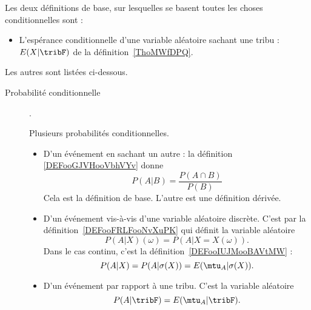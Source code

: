 

Les deux définitions de base, sur lesquelles se basent toutes les choses conditionnelles sont :
\begin{itemize}
	\item L'espérance conditionnelle d'une variable aléatoire sachant une tribu : \( E(X|\tribF)\) de la définition~\ref{ThoMWfDPQ}.
\end{itemize}

Les autres sont listées ci-dessous.
\begin{description}

	\item[Probabilité conditionnelle].

	      Plusieurs probabilités conditionnelles.
	      \begin{itemize}
		      \item D'un événement en sachant un autre : la définition \ref{DEFooGJVHooVbhVYv} donne
		            \begin{equation*}
			            P(A|B)=\frac{ P(A\cap B) }{ P(B) }
		            \end{equation*}
		            Cela est la définition de base. L'autre est une définition dérivée.
		      \item D'un événement vis-à-vis d'une variable aléatoire discrète. C'est par la définition~\ref{DEFooFRLFooNvXuPK} qui définit la variable aléatoire
		            \begin{equation*}
			            P(A|X)(\omega)=P(A|X=X(\omega)).
		            \end{equation*}
		            Dans le cas continu, c'est la définition~\ref{DEFooIUJMooBAVtMW} :
		            \begin{equation*}
			            P(A|X)=P(A|\sigma(X))=E(\mtu_A|\sigma(X)).
		            \end{equation*}

		      \item D'un événement par rapport à une tribu. C'est la variable aléatoire
		            \begin{equation*}
			            P(A|\tribF)=E(\mtu_A|\tribF).
		            \end{equation*}


\end{itemize}
\end{description}

